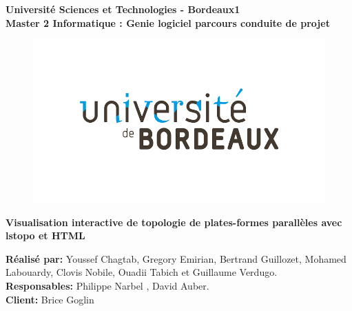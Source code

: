 \documentclass [a4paper,11pt]{article}
\begin{document}
\begin{titlepage}
\begin{center}
{\bf Université Sciences et Technologies - Bordeaux1} \vspace{0.5cm}\\

{\bf {\large Master 2 Informatique : Genie logiciel parcours conduite de projet}}\\

\begin{figure}[!ht]
  \centering
  \includegraphics[scale=0.2]{img/uniBx-logo}

  \label{fig:logUniBx}
\end{figure}

{\huge{\bf Visualisation interactive de topologie de plates-formes parallèles avec lstopo et HTML}}\\\vspace{0.5cm}


\end{center}

\textbf{Réalisé par:} Youssef Chagtab, Gregory Emirian, Bertrand Guillozet, Mohamed Labouardy, Clovis Nobile, Ouadii Tabich et Guillaume Verdugo. \\

\textbf{Responsables:} Philippe Narbel , David Auber.\\

\textbf{Client:} Brice Goglin\\


\end{titlepage}


\tableofcontents

\newpage
\end{document}
